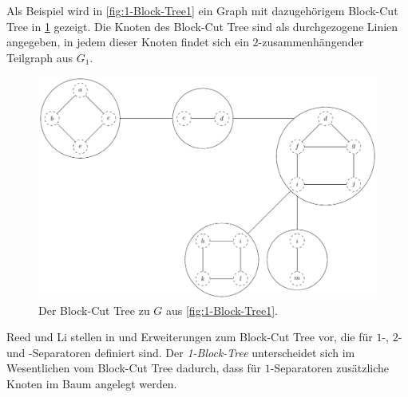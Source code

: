 Als Beispiel wird in \Abb \ref{fig:1-Block-Tree1} ein Graph mit dazugehörigem Block-Cut Tree in \Abb \ref{fig:1-Block-Tree2} gezeigt.
Die Knoten des Block-Cut Tree sind als durchgezogene Linien angegeben, in jedem dieser Knoten findet sich ein $2$-zusammenhängender Teilgraph aus $G_1$.
\begin{figure}[H]
  \centering
  \includegraphics[width=\textwidth,height=\textheight,keepaspectratio]{bilder/1-Block-Tree2.pdf}
  \caption{Der Block-Cut Tree zu $G$ aus \Abb \ref{fig:1-Block-Tree1}.}
  \label{fig:1-Block-Tree2}
\end{figure}

Reed und Li stellen in \cite{ReL} und \cite{ReL08} Erweiterungen zum Block-Cut Tree vor, die für $1$-, $2$- und \dd-Separatoren definiert sind.
Der \emph{1-Block-Tree} unterscheidet sich im Wesentlichen vom Block-Cut Tree dadurch, dass für $1$-Separatoren zusätzliche Knoten im Baum angelegt werden.

